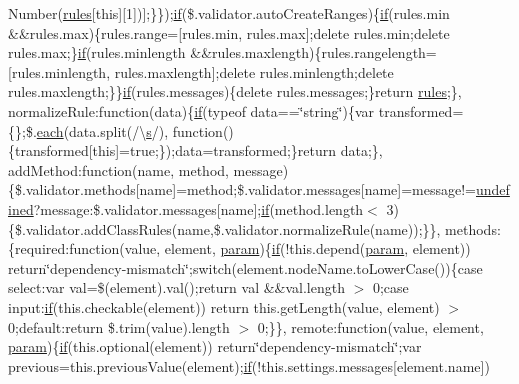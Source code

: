 \begin{DoxyCompactItemize}
Number(\hyperlink{_scripts_2respond_8js_ada87c2e257bc5ff6e77cdbc23ed986a3}{rules}\mbox{[}this\mbox{]}\mbox{[}1\mbox{]})\mbox{]};\}\});\hyperlink{_scripts_2respond_8min_8js_a93851d60dd037a83509a1757b9ee7b66}{if}(\$.validator.\+auto\+Create\+Ranges)\{\hyperlink{_scripts_2respond_8min_8js_a93851d60dd037a83509a1757b9ee7b66}{if}(rules.\+min \&\&rules.\+max)\{rules.\+range=\mbox{[}rules.\+min, rules.\+max\mbox{]};delete rules.\+min;delete rules.\+max;\}\hyperlink{_scripts_2respond_8min_8js_a93851d60dd037a83509a1757b9ee7b66}{if}(rules.\+minlength \&\&rules.\+maxlength)\{rules.\+rangelength=\mbox{[}rules.\+minlength, rules.\+maxlength\mbox{]};delete rules.\+minlength;delete rules.\+maxlength;\}\}\hyperlink{_scripts_2respond_8min_8js_a93851d60dd037a83509a1757b9ee7b66}{if}(rules.\+messages)\{delete rules.\+messages;\}return \hyperlink{_scripts_2respond_8js_ada87c2e257bc5ff6e77cdbc23ed986a3}{rules};\}, normalize\+Rule\+:function(data)\{\hyperlink{_scripts_2respond_8min_8js_a93851d60dd037a83509a1757b9ee7b66}{if}(typeof data==\char`\"{}string\char`\"{})\{var transformed=\{\};\$.\hyperlink{_scripts_2jquery-1_810_82_8min_8js_af24c9ea1e34372f8c8b312b35586008d}{each}(data.\+split(/\textbackslash{}\hyperlink{_scripts_2respond_8min_8js_ad9a7d92cb87932d25187fdec3ba1b621}{s}/), function()\{transformed\mbox{[}this\mbox{]}=true;\});data=transformed;\}return data;\}, add\+Method\+:function(name, method, message)\{\$.validator.\+methods\mbox{[}name\mbox{]}=method;\$.validator.\+messages\mbox{[}name\mbox{]}=message!=\hyperlink{_scripts_2jquery-1_810_82_8js_a08113a236cc18d2a9d5ce27e638012be}{undefined}?message\+:\$.\+validator.\+messages\mbox{[}name\mbox{]};\hyperlink{_scripts_2respond_8min_8js_a93851d60dd037a83509a1757b9ee7b66}{if}(method.\+length$<$ 3)\{\$.validator.\+add\+Class\+Rules(name,\$.validator.\+normalize\+Rule(name));\}\}, methods\+:\{required\+:function(value, element, \hyperlink{_scripts_2jquery-1_810_82_8min_8js_ae8915303d11557d1b001bc56b6195251}{param})\{\hyperlink{_scripts_2respond_8min_8js_a93851d60dd037a83509a1757b9ee7b66}{if}(!this.\+depend(\hyperlink{_scripts_2jquery-1_810_82_8min_8js_ae8915303d11557d1b001bc56b6195251}{param}, element)) return\char`\"{}dependency-\/mismatch\char`\"{};switch(element.\+node\+Name.\+to\+Lower\+Case())\{case \textquotesingle{}select\textquotesingle{}\+:var val=\$(element).val();return val \&\&val.\+length $>$ 0;case \textquotesingle{}input\textquotesingle{}\+:\hyperlink{_scripts_2respond_8min_8js_a93851d60dd037a83509a1757b9ee7b66}{if}(this.\+checkable(element)) return this.\+get\+Length(value, element) $>$ 0;default\+:return \$.trim(value).length $>$ 0;\}\}, remote\+:function(value, element, \hyperlink{_scripts_2jquery-1_810_82_8min_8js_ae8915303d11557d1b001bc56b6195251}{param})\{\hyperlink{_scripts_2respond_8min_8js_a93851d60dd037a83509a1757b9ee7b66}{if}(this.\+optional(element)) return\char`\"{}dependency-\/mismatch\char`\"{};var previous=this.\+previous\+Value(element);\hyperlink{_scripts_2respond_8min_8js_a93851d60dd037a83509a1757b9ee7b66}{if}(!this.\+settings.\+messages\mbox{[}element.\+name\mbox{]}) 
\end{DoxyCompactItemize}
